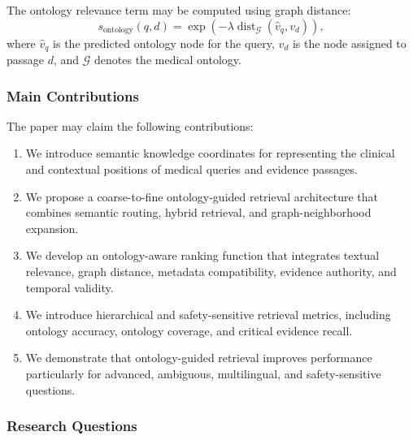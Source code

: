 \documentclass{article}
\begin{document}
The ontology relevance term may be computed using graph distance:
\begin{equation}
    s_{\mathrm{ontology}}(q,d)
    =
    \exp
    \left(
    -\lambda
    \operatorname{dist}_{\mathcal{G}}
    (\hat{v}_q,v_d)
    \right),
\end{equation}
where $\hat{v}_q$ is the predicted ontology node for the query, $v_d$ is the node assigned to passage $d$, and $\mathcal{G}$ denotes the medical ontology.

\subsubsection{Main Contributions}

The paper may claim the following contributions:
\begin{enumerate}
    \item We introduce semantic knowledge coordinates for representing the clinical and contextual positions of medical queries and evidence passages.

    \item We propose a coarse-to-fine ontology-guided retrieval architecture that combines semantic routing, hybrid retrieval, and graph-neighborhood expansion.

    \item We develop an ontology-aware ranking function that integrates textual relevance, graph distance, metadata compatibility, evidence authority, and temporal validity.

    \item We introduce hierarchical and safety-sensitive retrieval metrics, including ontology accuracy, ontology coverage, and critical evidence recall.

    \item We demonstrate that ontology-guided retrieval improves performance particularly for advanced, ambiguous, multilingual, and safety-sensitive questions.
\end{enumerate}

\subsubsection{Research Questions}
\end{document}
